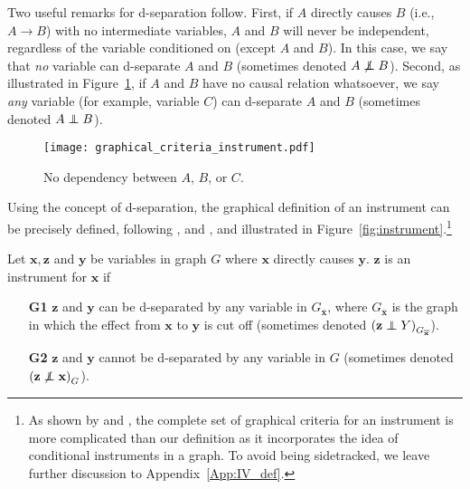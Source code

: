 \documentclass[11pt,review,authoryear]{elsarticle}
\begin{document}
\noindent
Two useful remarks for d-separation follow. First, if $A$ directly causes $B$ (i.e., $A \rightarrow B$) with no intermediate variables, $A$ and $B$ will never be independent, regardless of the variable conditioned on (except $A$ and $B$). In this case, we say that \textit{no} variable can d-separate $A$ and $B$ (sometimes denoted $A \not\perp\!\!\!\!\perp B$). Second, as illustrated in Figure~\ref{fig:graphical_criteria_instrument}, if $A$ and $B$ have no causal relation whatsoever, we say \textit{any} variable (for example, variable $C$) can d-separate $A$ and $B$ (sometimes denoted $A \perp\!\!\!\!\perp B$).%
\begin{figure}[H]
  \centering
  \texttt{[image: graphical\_criteria\_instrument.pdf]}
  \caption{No dependency between $A$, $B$, or $C$.}
  \label{fig:graphical_criteria_instrument}
\end{figure}

Using the concept of d-separation, the graphical definition of an instrument can be precisely defined, following \citet{brito2002generalized}, \citet{pearl2009causality} and \citet{silva2017learning}, and illustrated in Figure~\ref{fig:instrument}.\footnote{As shown by \citet{brito2002generalized} and \citet[pp.~247-248]{pearl2009causality}, the complete set of graphical criteria for an instrument is more complicated than our definition as it incorporates the idea of conditional instruments in a graph. To avoid being sidetracked, we leave further discussion to Appendix~\ref{App:IV_def}.}

\begin{definition}
  \label{def:instrument_variable}
  Let $\mathbf{x}, \mathbf{z}$ and $\mathbf{y}$ be variables in graph $G$ where $\mathbf{x}$ directly causes $\mathbf{y}$. $\mathbf{z}$ is an instrument for $\mathbf{x}$ if
  \begin{itemize}
    \item[\textbf{G1}] $\mathbf{z}$ and $\mathbf{y}$ can be d-separated by any variable in $G_{\overline{\mathbf{x}}}$, where $G_{\overline{\mathbf{x}}}$ is the graph in which the effect from $\mathbf{x}$ to $\mathbf{y}$ is cut off (sometimes denoted $\left(\mathbf{z} \perp\!\!\!\!\perp Y \right)_{G_{\overline{\mathbf{x}}}}$).
    \item[\textbf{G2}] $\mathbf{z}$ and $\mathbf{y}$ cannot be d-separated by any variable in $G$ (sometimes denoted $\left(\mathbf{z} \not\perp\!\!\!\!\perp \mathbf{x} \right)_G$).
  \end{itemize}
\end{definition}
\end{document}
